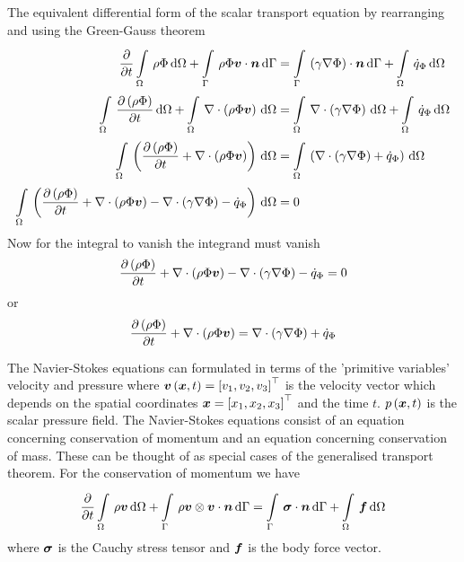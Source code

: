 The equivalent differential form of the scalar transport equation by
rearranging  and using the Green-Gauss
theorem \ie
\begin{equation}
  \begin{split}
    \delby{}{t}\gint{\Omega}{}{\rho\Phi}{\Omega}+\gint{\Gamma}{}{\dotprod{\rho\Phi\vectr{v}}{\vectr{n}}}{\Gamma}
    &=\gint{\Gamma}{}{\dotprod{\pbrac{\gamma\gradient{}{\Phi}}}{\vectr{n}}}{\Gamma}+\gint{\Omega}{}{\dot{q}_{\Phi}}{\Omega}\\
    \gint{\Omega}{}{\delby{\pbrac{\rho\Phi}}{t}}{\Omega}+\gint{\Omega}{}{\divergence{}{\pbrac{\rho\Phi\vectr{v}}}}{\Omega}
    &=\gint{\Omega}{}{\divergence{}{\pbrac{\gamma\gradient{}{\Phi}}}}{\Omega}+\gint{\Omega}{}{\dot{q}_{\Phi}}{\Omega}
    \\
    \gint{\Omega}{}{\pbrac{\delby{\pbrac{\rho\Phi}}{t}+\divergence{}{\pbrac{\rho\Phi\vectr{v}}}}}{\Omega}
    &=\gint{\Omega}{}{\pbrac{\divergence{}{\pbrac{\gamma\gradient{}{\Phi}}}+\dot{q}_{\Phi}}}{\Omega}
    \\
    \gint{\Omega}{}{\pbrac{\delby{\pbrac{\rho\Phi}}{t}+\divergence{}{\pbrac{\rho\Phi\vectr{v}}}-
        \divergence{}{\pbrac{\gamma\gradient{}{\Phi}}}-\dot{q}_{\Phi}}}{\Omega}
    &= 0
  \end{split}
\end{equation}
Now for the integral to vanish the integrand must vanish \ie
\begin{equation}
  \delby{\pbrac{\rho\Phi}}{t}+\divergence{}{\pbrac{\rho\Phi\vectr{v}}}
  -\divergence{}{\pbrac{\gamma\gradient{}{\Phi}}}-\dot{q}_{\Phi}=0
\end{equation}
or
\begin{equation}
  \delby{\pbrac{\rho\Phi}}{t}+\divergence{}{\pbrac{\rho\Phi\vectr{v}}}=\divergence{}{\pbrac{\gamma\gradient{}{\Phi}}}+\dot{q}_{\Phi}
  \label{eqn:NSEDifferntialGenScalarTransport}
\end{equation}

The Navier-Stokes equations can formulated in terms of the 'primitive
variables' \ie velocity and pressure where
$  \boldsymbol{v} \left(  \boldsymbol{x} ,t \right) = {\left[ v_{1},v_{2},v_{3} \right]}^{ \top } $ is the
velocity vector which depends on the spatial coordinates
$ \boldsymbol{x} = {\left[ x_{1},x_{2},x_{3} \right]}^{ \top } $ and the time
$t$. $ p\left(  \boldsymbol{x} ,t \right) $ is the scalar pressure field. The Navier-Stokes
equations consist of an equation concerning conservation of momentum and an
equation concerning conservation of mass. These can be thought of as special
cases of the generalised transport theorem. For the conservation of momentum
we have
\begin{equation}
  \delby{}{t}\gint{\Omega}{}{\rho\vectr{v}}{\Omega}
  +\gint{\Gamma}{}{\dotprod{\tensorprod{\rho\vectr{v}}{\vectr{v}}}{\vectr{n}}}{\Gamma}
  =\gint{\Gamma}{}{\dotprod{\tensor{\sigma}}{\vectr{n}}}{\Gamma}+\gint{\Omega}{}{\vectr{f}}{\Omega}
\end{equation}
where $\boldsymbol{\mathit{\sigma}}$ is the Cauchy stress tensor and $ \boldsymbol{f} $ is the body force
vector.

